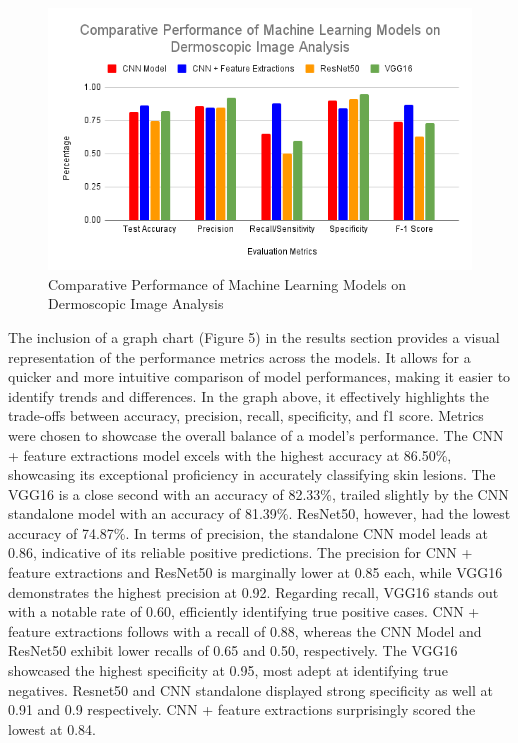 \documentclass[10pt,twocolumn]{article}
\begin{document}
\begin{figure}[h]
\caption{Comparative Performance of Machine Learning Models on Dermoscopic Image Analysis}
\centering
\includegraphics[scale=0.4]{Comparative Performance of Machine Learning Models on Dermoscopic Image Analysis.png}\newline
\end{figure}

The inclusion of a graph chart (Figure 5) in the results section provides a visual representation of the performance metrics across the models. It allows for a quicker and more intuitive comparison of model performances, making it easier to identify trends and differences. In the graph above, it effectively highlights the trade-offs between accuracy, precision, recall, specificity, and f1 score. Metrics were chosen to showcase the overall balance of a model's performance. \newline
The CNN + feature extractions model excels with the highest accuracy at 86.50\%, showcasing its exceptional proficiency in accurately classifying skin lesions. The VGG16 is a close second with an accuracy of 82.33\%, trailed slightly by the CNN standalone model with an accuracy of 81.39\%. ResNet50, however, had the lowest accuracy of 74.87\%.
In terms of precision, the standalone CNN model leads at 0.86, indicative of its reliable positive predictions. The precision for CNN + feature extractions and ResNet50 is marginally lower at 0.85 each, while VGG16 demonstrates the highest precision at 0.92. Regarding recall, VGG16 stands out with a notable rate of 0.60, efficiently identifying true positive cases. CNN + feature extractions follows with a recall of 0.88, whereas the CNN Model and ResNet50 exhibit lower recalls of 0.65 and 0.50, respectively. The VGG16 showcased the highest specificity at 0.95, most adept at identifying true negatives. Resnet50 and CNN standalone displayed strong specificity as well at 0.91 and 0.9 respectively. CNN + feature extractions surprisingly scored the lowest at 0.84. \newline
\end{document}
